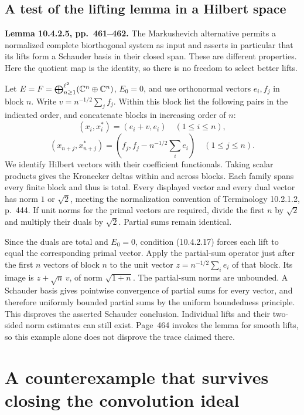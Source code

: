 \documentclass[11pt,reqno]{amsart}
\numberwithin{equation}{section}
\begin{document}
\subsection{A test of the lifting lemma in a Hilbert space}
\textbf{Lemma 10.4.2.5, pp.~461--462.} The Markushevich alternative permits a normalized complete biorthogonal system as input and asserts in particular that its lifts form a Schauder basis in their closed span. These are different properties. Here the quotient map is the identity, so there is no freedom to select better lifts.

Let \(E=F=\bigoplus_{n\ge1}^{\ell^2}(\mathbb C^n\oplus\mathbb C^n)\), \(E_0=0\), and use orthonormal vectors \(e_i,f_j\) in block \(n\). Write \(v=n^{-1/2}\sum_j f_j\). Within this block list the following pairs in the indicated order, and concatenate blocks in increasing order of \(n\):
\[
  (x_i,x_i^*)=(e_i+v,e_i)\quad(1\le i\le n),\]\[
  (x_{n+j},x_{n+j}^*)=(f_j,f_j-n^{-1/2}\textstyle\sum_i e_i)
       \quad(1\le j\le n).
\]
We identify Hilbert vectors with their coefficient functionals. Taking scalar products gives the Kronecker deltas within and across blocks. Each family spans every finite block and thus is total. Every displayed vector and every dual vector has norm \(1\) or \(\sqrt 2\), meeting the normalization convention of Terminology 10.2.1.2, p.~444. If unit norms for the primal vectors are required, divide the first \(n\) by \(\sqrt2\) and multiply their duals by \(\sqrt2\). Partial sums remain identical.

Since the duals are total and \(E_0=0\), condition (10.4.2.17) forces each lift to equal the corresponding primal vector. Apply the partial-sum operator just after the first \(n\) vectors of block \(n\) to the unit vector \(z=n^{-1/2}\sum_i e_i\) of that block. Its image is \(z+\sqrt n\,v\), of norm \(\sqrt{1+n}\). The partial-sum norms are unbounded. A Schauder basis gives pointwise convergence of partial sums for every vector, and therefore uniformly bounded partial sums by the uniform boundedness principle. This disproves the asserted Schauder conclusion. Individual lifts and their two-sided norm estimates can still exist. Page~464 invokes the lemma for smooth lifts, so this example alone does not disprove the trace claimed there.


\section{A counterexample that survives closing the convolution ideal}\label{sec:2}
\end{document}
